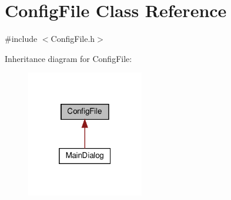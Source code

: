 \hypertarget{classConfigFile}{}\section{Config\+File Class Reference}
\label{classConfigFile}


{\ttfamily \#include $<$Config\+File.\+h$>$}



Inheritance diagram for Config\+File\+:\nopagebreak
\begin{figure}[H]
\begin{center}
\leavevmode
\includegraphics[width=145pt]{classConfigFile__inherit__graph}
\end{center}
\end{figure}
